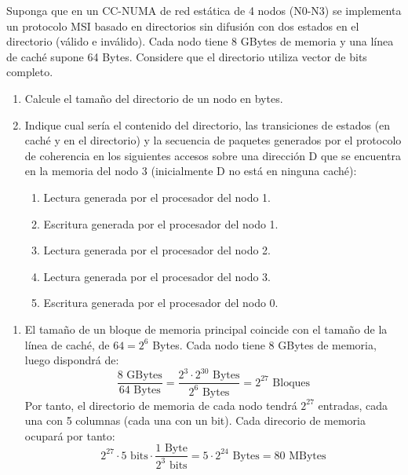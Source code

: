 \begin{ejercicio}
    Suponga que en un CC-NUMA de red estática de 4 nodos (N0-N3) se implementa un protocolo MSI basado en directorios sin difusión con dos estados en el directorio (válido e inválido). Cada nodo tiene 8 GBytes de memoria y una línea de caché supone 64 Bytes. Considere que el directorio utiliza vector de bits completo.
    \begin{enumerate}
        \item Calcule el tamaño del directorio de un nodo en bytes.
        \item Indique cual sería el contenido del directorio, las transiciones de estados (en caché y en el directorio) y la secuencia de paquetes generados por el protocolo de coherencia en los siguientes accesos sobre una dirección D que se encuentra en la memoria del nodo 3 (inicialmente D no está en ninguna caché):
        \begin{enumerate}
            \item Lectura generada por el procesador del nodo 1.
            \item Escritura generada por el procesador del nodo 1.
            \item Lectura generada por el procesador del nodo 2.
            \item Lectura generada por el procesador del nodo 3.
            \item Escritura generada por el procesador del nodo 0.
        \end{enumerate}
    \end{enumerate}

\begin{enumerate}
    \item El tamaño de un bloque de memoria principal coincide con el tamaño de la línea de caché, de $64 = 2^6$ Bytes. Cada nodo tiene 8 GBytes de memoria, luego dispondrá de:
        \begin{equation*}
            \dfrac{8 \text{\ GBytes}}{64 \text{\ Bytes}} = \dfrac{2^3\cdot 2^{30} \text{\ Bytes}}{2^6 \text{\ Bytes}} = 2^{27} \text{\ Bloques}
        \end{equation*}
        Por tanto, el directorio de memoria de cada nodo tendrá $2^{27}$ entradas, cada una con 5 columnas (cada una con un bit). Cada direcorio de memoria ocupará por tanto:
        \begin{equation*}
            2^{27}\cdot 5 {\text{\ bits}} \cdot \frac{1 \text{\ Byte}}{{2^3 \text{\ bits}}} = 5 \cdot 2^{24} \text{\ Bytes} = 80 \text{\ MBytes}
        \end{equation*}
        

\end{enumerate}
\end{ejercicio}
